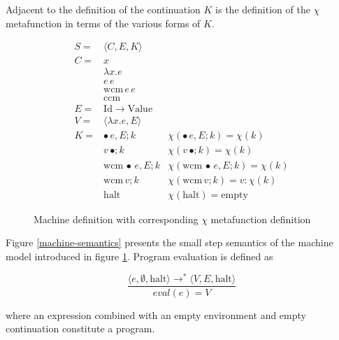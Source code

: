 \documentclass[ms]{byuprop}
\newcounter{definition}
\begin{document}
Adjacent to the definition of the continuation $K$ is the definition of the $\chi$ metafunction 
in terms of the various forms of $K$.

\begin{figure}
\begin{align*}
S= & \langle C,E,K\rangle\\
C= & x\\
   & \lambda x.e\\
   & e\,e\\
   & \mathrm{wcm}\,e\,e\\
   & \mathrm{ccm}\\
E= & \mathrm{Id}\rightarrow\mathrm{Value}\\
V= & \langle\lambda x.e,E\rangle\\
K= & \bullet\,e,E;k               & \chi(\bullet\,e,E;k)=\chi(k)\\
   & v\,\bullet;k                 & \chi(v\,\bullet;k)=\chi(k)\\
   & \mathrm{wcm}\,\bullet\,e,E;k & \chi(\mathrm{wcm}\,\bullet\,e,E;k)=\chi(k)\\
   & \mathrm{wcm}\,v; k           & \chi(\mathrm{wcm}\,v; k)=v:\chi(k)\\
   & \mathrm{halt}                & \chi(\mathrm{halt})=\mathrm{empty}
\end{align*}
\caption{Machine definition with corresponding $\chi$ metafunction definition}
\label{machine-definition}
\end{figure}

Figure \ref{machine-semantics} presents the small step semantics of the machine model 
introduced in figure \ref{machine-definition}. Program evaluation is defined as

\[
\frac{\langle e,\emptyset,\mathrm{halt}\rangle\rightarrow^{*}\langle V,E,\mathrm{halt}\rangle}{eval(e)=V}
\]

where an expression combined with an empty environment and empty continuation constitute 
a program.
\end{document}
